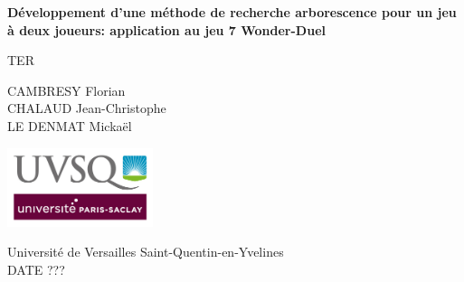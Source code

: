 \begin{titlepage}
    \begin{center}
        \vspace*{1cm}

        \Huge
        \textbf{Développement d'une méthode de recherche arborescence pour un jeu à deux joueurs:
            application au jeu 7 Wonder-Duel}

        \vspace{0.4cm}
        \LARGE
        TER

        \vspace{1.6cm}

        \large
        CAMBRESY Florian \\
        CHALAUD Jean-Christophe \\
        LE DENMAT Mickaël \\

        \vfill

        \vspace{0.8cm}
        \includegraphics[width=0.32\textwidth]{images/UVSQ-logo}

        \vspace{0.4cm}

        \Large
        Université de Versailles Saint-Quentin-en-Yvelines \\
        \vspace{0.4cm}
        DATE ???
    \end{center}
\end{titlepage}
